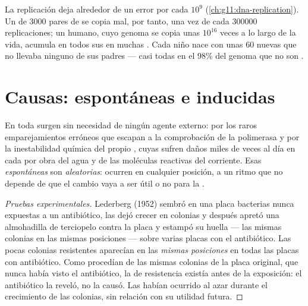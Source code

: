 \begin{example}\label{ex:g11:mutations:frequency}
La replicación deja alrededor de un error por cada $10^9$ 
(\cref{ch:g11:dna-replication}). Un  de $\num{3000}$ pares de 
se copia mal, por tanto, una vez de cada $\num{300000}$ replicaciones;
un humano, cuyo genoma se copia unas $10^{16}$ veces a lo largo de la
vida, acumula  en todos sus  en muchas . Cada
niño nace con unas 60  nuevas que no llevaba ninguno de sus
padres --- casi todas en el 98\% del genoma que no son .
\end{example}

\section{Causas: espontáneas e inducidas}

\begin{proposition}\label{prop:g11:mutations:spontaneous}
En toda  surgen  sin necesidad de ningún agente
externo: por los raros emparejamientos erróneos que escapan a la
comprobación de la polimerasa y por la inestabilidad química del propio
, cuyas  sufren daños miles de veces al día en cada  por
obra del agua y de las moléculas reactivas del  corriente.
Esas \emph{ espontáneas} son \emph{aleatorias}: ocurren en
cualquier posición, a un ritmo que no depende de que el cambio vaya a
ser útil o no para la .
\end{proposition}
\begin{proof}[Pruebas experimentales]
Lederberg (1952) sembró en una placa bacterias nunca expuestas a un
antibiótico, las dejó crecer en colonias y después apretó una almohadilla
de terciopelo contra la placa y estampó su huella --- las mismas
colonias en las mismas posiciones --- sobre varias placas con el
antibiótico. Las pocas colonias resistentes aparecían en las
\emph{mismas posiciones} en todas las placas con antibiótico. Como
procedían de las mismas colonias de la placa original, que nunca había
visto el antibiótico, la  de resistencia existía antes de la
exposición: el antibiótico la reveló, no la causó. Las 
habían ocurrido al azar durante el crecimiento de las colonias, sin
relación con su utilidad futura.
\end{proof}

